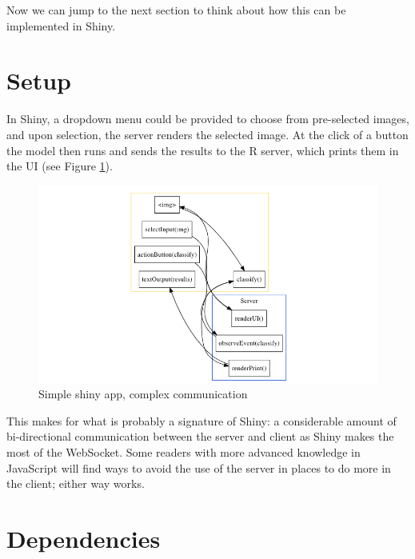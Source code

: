 \documentclass[10pt,]{krantz}
\begin{document}
Now we can jump to the next section to think about how this can be implemented in Shiny.

\hypertarget{shiny-complete-setup}{%
\section{Setup}\label{shiny-complete-setup}}

In Shiny, a dropdown menu could be provided to choose from pre-selected images, and upon selection, the server renders the selected image. At the click of a button the model then runs and sends the results to the R server, which prints them in the UI (see Figure \ref{fig:shiny-complex-diagram}).

\begin{figure}[H]

{\centering \includegraphics[width=1\linewidth]{images/04-shiny-complex} 

}

\caption{Simple shiny app, complex communication}\label{fig:shiny-complex-diagram}
\end{figure}

This makes for what is probably a signature of Shiny: a considerable amount of bi-directional communication between the server and client as Shiny makes the most of the WebSocket. Some readers with more advanced knowledge in JavaScript will find ways to avoid the use of the server in places to do more in the client; either way works.

\hypertarget{shiny-complete-dependencies}{%
\section{Dependencies}\label{shiny-complete-dependencies}}
\end{document}
